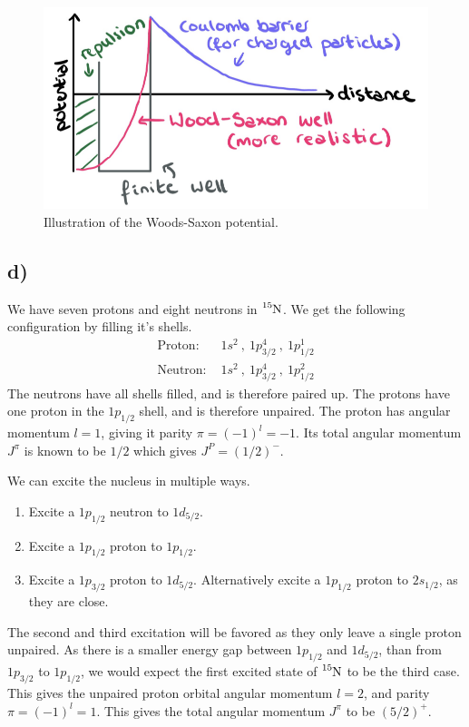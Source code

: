 \documentclass{article}
\begin{document}
\begin{figure}[h!]
\centering
\includegraphics[width = .65\textwidth]{WS.png}
\caption{Illustration of the Woods-Saxon potential.}
\label{fig: WS}
\end{figure}


\subsection*{d)}
We have seven protons and eight neutrons in $\ce{_{}^{15}\text{N}_{}}$. We get the following configuration by filling it's shells. 
\begin{align}
    \text{Proton: } & 1s^{2} \ , \ 1p^{4}_{3 / 2} \ , \ 1p^{1}_{1 / 2} \\
    \text{Neutron: } & 1s^{2} \ , \ 1p^{4}_{3 / 2} \ , \ 1p^{2}_{1 / 2}
\end{align}
The neutrons have all shells filled, and is therefore paired up. The protons have one proton in the $1p_{1 / 2}$ shell, and is therefore unpaired. The proton has angular momentum $l = 1$, giving it parity $π = (-1)^{l} = -1$. Its total angular momentum $J^{π}$ is known to be $1 / 2$ which gives $J^{P} = (1 / 2)^{-}$. 

We can excite the nucleus in multiple ways. 
\begin{enumerate}
    \item Excite a $1p_{1 / 2}$ neutron to $1d_{5 / 2}$.
    \item Excite a $1p_{1 / 2}$ proton to $1p_{1 / 2}$.
    \item Excite a $1p_{3 / 2}$ proton to $1d_{5 / 2}$. Alternatively excite a $1p_{1 / 2}$ proton to $2s_{1 / 2}$, as they are close.
\end{enumerate}
The second and third excitation will be favored as they only leave a single proton unpaired. As there is a smaller energy gap between $1p_{1 / 2}$ and $1d_{5 / 2}$, than from $1p_{3 / 2}$ to $1p_{1 / 2}$, we would expect the first excited state of $\ce{_{}^{15}\text{N}_{}}$ to be the third case. This gives the unpaired proton orbital angular momentum $l = 2$, and parity $π = (-1)^{l} = 1$. This gives the total angular momentum $J^{π}$ to be $(5 / 2)^{+}$.
\end{document}
